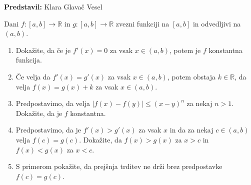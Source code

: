 \textbf{Predstavil: } Klara Glavač Vesel

Dani $f \colon [a,b] \to \mathbb{R}$  in $g \colon [a,b] \to \mathbb{R}$  zvezni  funkciji na $[a,b]$ in odvedljivi na $(a,b)$.
			\begin{enumerate}
				\item Dokažite, da če je $f'(x) = 0$ za vsak $x \in (a,b)$, potem je $f$ konstantna funkcija.
				\item Če velja da $f'(x) = g'(x)$ za vsak $x \in (a,b)$, potem obstaja $k \in \mathbb{R}$, da velja $f(x) = g(x) + k$ za vsak $x \in (a,b)$.
				\item Predpostavimo, da velja $|f(x) - f(y)| \leq (x - y)^n$ za nekaj $n > 1$.  Dokažite, da je $f$ konstantna.
				\item Predpostavimo, da je $f'(x) > g'(x)$ za vsak $x$ in da za nekaj $c \in  (a, b)$  velja $f(c) = g(c).$ Dokažite, da $f(x) > g(x)$ za $x > c$ in $f(x) < g(x)$ za $x < c$.
				\item S primerom pokažite, da prejšnja trditev ne drži brez predpostavke $f(c) = g(c)$.
			\end{enumerate}